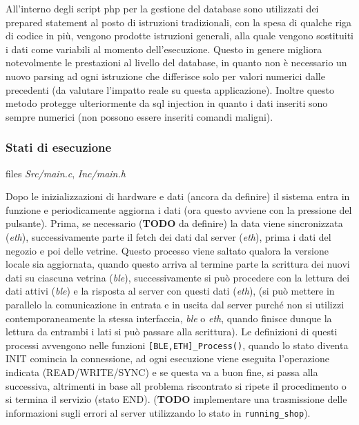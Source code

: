 All'interno degli script php per la gestione del database sono utilizzati dei prepared statement al posto di istruzioni tradizionali, con la spesa di qualche riga di codice in pi\`{u}, vengono prodotte istruzioni generali, alla quale vengono sostituiti i dati come variabili al momento dell'esecuzione. Questo in genere migliora notevolmente le prestazioni al livello del database, in quanto non \`{e} necessario un nuovo parsing ad ogni istruzione che differisce solo per valori numerici dalle precedenti (da valutare l'impatto reale su questa applicazione). Inoltre questo metodo protegge ulteriormente da sql injection in quanto i dati inseriti sono sempre numerici (non possono essere inseriti comandi maligni).

\subsubsection{Stati di esecuzione}

files \textit{Src/main.c}, \textit{Inc/main.h}

Dopo le inizializzazioni di hardware e dati (ancora da definire) il sistema entra in funzione e periodicamente aggiorna i dati (ora questo avviene con la pressione del pulsante). Prima, se necessario (\textbf{TODO} da definire) la data viene sincronizzata (\textit{eth}), successivamente parte il fetch dei dati dal server (\textit{eth}), prima i dati del negozio e poi delle vetrine. Questo processo viene saltato qualora la versione locale sia aggiornata, quando questo arriva al termine parte la scrittura dei nuovi dati su ciascuna vetrina (\textit{ble}), successivamente si pu\`{o} procedere con la lettura dei dati attivi (\textit{ble}) e la risposta al server con questi dati (\textit{eth}), (si pu\`{o} mettere in parallelo la comunicazione in entrata e in uscita dal server purch\'{e} non si utilizzi contemporaneamente la stessa interfaccia, \textit{ble} o \textit{eth}, quando finisce dunque la lettura da entrambi i lati si pu\`{o} passare alla scrittura). Le definizioni di questi processi avvengono nelle funzioni \texttt{[BLE,ETH]\_Process()}, quando lo stato diventa INIT comincia la connessione, ad ogni esecuzione viene eseguita l'operazione indicata (READ/WRITE/SYNC) e se questa va a buon fine, si passa alla successiva, altrimenti in base all problema riscontrato si ripete il procedimento o si termina il servizio (stato END). (\textbf{TODO} implementare una trasmissione delle informazioni sugli errori al server utilizzando lo stato in \texttt{running\_shop}). 

